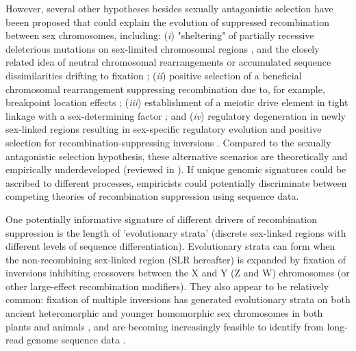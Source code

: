 \documentclass{article}[12pt]
\begin{document}
However, several other hypotheses besides sexually antagonistic selection have beeen proposed that could explain the evolution of suppressed recombination between sex chromosomes, including: ({\itshape i}) "sheltering" of partially recessive deleterious mutations on sex-limited chromosomal regions \citep{Ironside2010, Ponnikas2018, Olito-etal-2022, Jay2022}, and the closely related idea of neutral chromosomal rearrangements or accumulated sequence dissimilarities drifting to fixation \citep{CharlesworthMarais2005}; ({\itshape ii}) positive selection of a beneficial chromosomal rearrangement suppressing recombination \citep{Haldane1957} due to, for example, breakpoint location effects \citep{CorbettDetig2016}; ({\itshape iii}) establishment of a meiotic drive element in tight linkage with a sex-determining factor \citep{UbedaPatten2010}; and ({\itshape iv}) regulatory degeneration in newly sex-linked regions resulting in sex-specific regulatory evolution and positive selection for recombination-suppressing inversions \citep{LenormandRoze2022}. Compared to the sexually antagonistic selection hypothesis, these alternative scenarios are theoretically and empirically underdeveloped (reviewed in \citealt{Ironside2010, Ponnikas2018,Olito-etal-2022}). If unique genomic signatures could be ascribed to different processes, empiricists could potentially discriminate between competing theories of recombination suppression using sequence data. 

One potentially informative signature of different drivers of recombination suppression is the length of 'evolutionary strata' (discrete sex-linked regions with different levels of sequence differentiation). Evolutionary strata can form when the non-recombining sex-linked region (SLR hereafter) is expanded by fixation of inversions inhibiting crossovers between the X and Y (Z and W) chromosomes (or other large-effect recombination modifiers). They also appear to be relatively common: fixation of multiple inversions has generated evolutionary strata on both ancient heteromorphic and younger homomorphic sex chromosomes in both plants and animals \citep{LahnPage1999,Handley2004, Wang2012}, and are becoming increasingly feasible to identify from long-read genome sequence data \citep{WellenreutherBernatchez2018}. 
\end{document}
